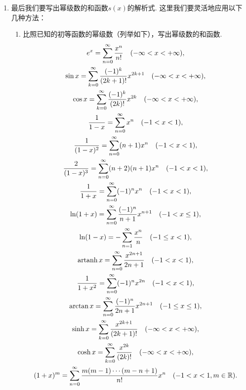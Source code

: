 \begin{enumerate}
	\item 最后我们要写出幂级数的和函数\(s(x)\)的解析式.
	这里我们要灵活地应用以下几种方法：\begin{enumerate}
		\item 比照已知的初等函数的幂级数（列举如下），写出幂级数的和函数.
		\begin{gather*}
			e^x = \sum_{n=0}^\infty \frac{x^n}{n!}
				\quad(-\infty<x<+\infty), \\
			\sin x = \sum_{k=0}^\infty \frac{(-1)^k}{(2k+1)!} x^{2k+1}
				\quad(-\infty<x<+\infty), \\
			\cos x = \sum_{k=0}^\infty \frac{(-1)^k}{(2k)!} x^{2k}
				\quad(-\infty<x<+\infty), \\
			\frac{1}{1-x} = \sum_{n=0}^\infty x^n
				\quad(-1<x<1), \\
			\frac{1}{(1-x)^2} = \sum_{n=0}^\infty (n+1) x^n
				\quad(-1<x<1), \\
			\frac{2}{(1-x)^3} = \sum_{n=0}^\infty (n+2)(n+1) x^n
				\quad(-1<x<1), \\
			\frac{1}{1+x} = \sum_{n=0}^\infty (-1)^n x^n
				\quad(-1<x<1), \\
			\ln(1+x) = \sum_{n=0}^\infty \frac{(-1)^n}{n+1} x^{n+1}
				\quad(-1<x\leq1), \\
			\ln(1-x) = -\sum_{n=1}^\infty \frac{x^n}{n}
				\quad(-1\leq x<1), \\
			\operatorname{artanh} x = \sum_{n=0}^\infty \frac{x^{2n+1}}{2n+1}
				\quad(-1<x<1), \\
			\frac{1}{1+x^2} = \sum_{n=0}^\infty (-1)^n x^{2n}
				\quad(-1<x<1), \\
			\arctan x = \sum_{n=0}^\infty \frac{(-1)^n}{2n+1} x^{2n+1}
				\quad(-1 \leq x \leq 1), \\
			\sinh x = \sum_{k=0}^\infty \frac{x^{2k+1}}{(2k+1)!}
				\quad(-\infty<x<+\infty), \\
			\cosh x = \sum_{k=0}^\infty \frac{x^{2k}}{(2k)!}
				\quad(-\infty<x<+\infty), \\
			(1+x)^m = \sum_{n=0}^\infty \frac{m(m-1)\dotsm(m-n+1)}{n!} x^n
				\quad(-1<x<1,m\in\mathbb{R}).
		\end{gather*}


\end{enumerate}
\end{enumerate}
